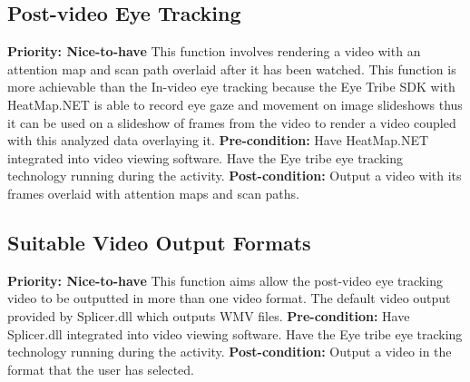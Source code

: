 \subsection{Post-video Eye Tracking}
    \textbf{Priority: Nice-to-have}\newline
    This function involves rendering a video with an attention map and scan path overlaid after it has been watched. This function is more achievable than the In-video eye tracking because the Eye Tribe SDK with HeatMap.NET is able to record eye gaze and movement on image slideshows thus it can be used on a slideshow of frames from the video to render a video coupled with this analyzed data overlaying it.\newline
\textbf{Pre-condition: }Have HeatMap.NET integrated into video viewing software. Have the Eye tribe eye tracking technology running during the activity.\newline   
\textbf{Post-condition: }Output a video with its frames overlaid with attention maps and scan paths.

\subsection{Suitable Video Output Formats} 
    \textbf{Priority: Nice-to-have}\newline
    This function aims allow the post-video eye tracking video to be outputted in more than one video format. The default video output provided by Splicer.dll which outputs WMV files.\newline
    \textbf{Pre-condition: }Have Splicer.dll integrated into video viewing software. Have the Eye tribe eye tracking technology running during the activity.\newline
    \textbf{Post-condition: }Output a video in the format that the user has selected.
